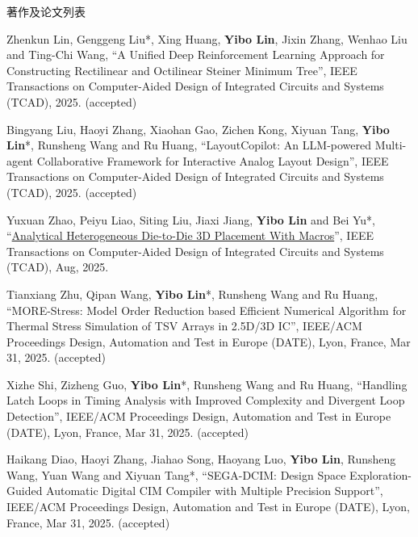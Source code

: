 \begin{rSection}{著作及论文列表}
\begin{description}[font=\normalfont, rightmargin=2em]
\item[{[J174]}]{
        Zhenkun Lin, Genggeng Liu*, Xing Huang, \textbf{Yibo Lin}, Jixin Zhang, Wenhao Liu and Ting-Chi Wang, 
    ``A Unified Deep Reinforcement Learning Approach for Constructing Rectilinear and Octilinear Steiner Minimum Tree'', 
    IEEE Transactions on Computer-Aided Design of Integrated Circuits and Systems (TCAD), 2025.
    (accepted)
}
            

\item[{[J173]}]{
        Bingyang Liu, Haoyi Zhang, Xiaohan Gao, Zichen Kong, Xiyuan Tang, \textbf{Yibo Lin}*, Runsheng Wang and Ru Huang, 
    ``LayoutCopilot: An LLM-powered Multi-agent Collaborative Framework for Interactive Analog Layout Design'', 
    IEEE Transactions on Computer-Aided Design of Integrated Circuits and Systems (TCAD), 2025.
    (accepted)
}
            

\item[{[J172]}]{
        Yuxuan Zhao, Peiyu Liao, Siting Liu, Jiaxi Jiang, \textbf{Yibo Lin} and Bei Yu*, 
    ``\href{https://doi.org/10.1109/TCAD.2024.3444716}{Analytical Heterogeneous Die-to-Die 3D Placement With Macros}'', 
    IEEE Transactions on Computer-Aided Design of Integrated Circuits and Systems (TCAD), Aug, 2025.
    
}
            

\item[{[C171]}]{
        Tianxiang Zhu, Qipan Wang, \textbf{Yibo Lin}*, Runsheng Wang and Ru Huang, 
    ``MORE-Stress: Model Order Reduction based Efficient Numerical Algorithm for Thermal Stress Simulation of TSV Arrays in 2.5D/3D IC'', 
    IEEE/ACM Proceedings Design, Automation and Test in Europe (DATE), Lyon, France, Mar 31, 2025.
    (accepted)
}
            

\item[{[C170]}]{
        Xizhe Shi, Zizheng Guo, \textbf{Yibo Lin}*, Runsheng Wang and Ru Huang, 
    ``Handling Latch Loops in Timing Analysis with Improved Complexity and Divergent Loop Detection'', 
    IEEE/ACM Proceedings Design, Automation and Test in Europe (DATE), Lyon, France, Mar 31, 2025.
    (accepted)
}
            

\item[{[C169]}]{
        Haikang Diao, Haoyi Zhang, Jiahao Song, Haoyang Luo, \textbf{Yibo Lin}, Runsheng Wang, Yuan Wang and Xiyuan Tang*, 
    ``SEGA-DCIM: Design Space Exploration-Guided Automatic Digital CIM Compiler with Multiple Precision Support'', 
    IEEE/ACM Proceedings Design, Automation and Test in Europe (DATE), Lyon, France, Mar 31, 2025.
    (accepted)
}
            


\end{description}
\end{rSection}
